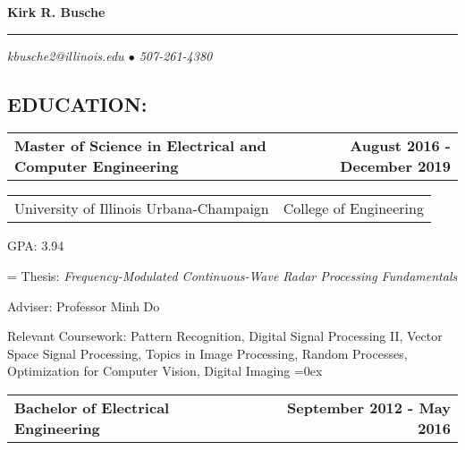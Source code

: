 \documentclass[10pt, letterpaper]{article}
\makeatletter
\newcommand{\headerrow}[2]
{\begin{tabular*}{\linewidth}{l@{\extracolsep{\fill}}r}
	#1 &
	#2 \\
\end{tabular*}}
\newcommand{\sansserif}{\cabin}
\makeatother
\begin{document}
{\sansserif \LARGE \textbf{Kirk R. Busche}}

\rule{\textwidth}{0.5ex}
\vspace{-2em}
\begin{center}
	{\sansserif\small \textit{kbusche2@illinois.edu $\bullet$ 507-261-4380}}
\end{center}

\subsection*{\sansserif EDUCATION:}

\begin{comment}
\headerrow
	{\textbf{Ph.D. Student in Electrical and Computer Engineering}}
	{\textbf{August 2016 - Present}}

University of Illinois Urbana-Champaign

College of Engineering

GPA: 3.94

\newlength{\mylength}
\settowidth{\mylength}{Relevant Coursework:}
\hangindent=\mylength
Relevant Coursework: Pattern Recognition, Digital Signal Processing II, Vector
Space Signal Processing, Topics in Image Processing, Random Processes,
Optimization for Computer Vision, Digital Imaging
\hangindent=0ex
\\
\end{comment}

\headerrow
	{\textbf{Master of Science in Electrical and Computer Engineering}}
	{\textbf{August 2016 - December 2019}}

\headerrow
	{University of Illinois Urbana-Champaign}
	{College of Engineering}

GPA: 3.94

\newlength{\mylength}
\settowidth{\mylength}{Relevant Coursework:}
\hangindent=\mylength
{Thesis: \textit{Frequency-Modulated Continuous-Wave Radar Processing
	Fundamentals}}

{Adviser: Professor Minh Do}

{Relevant Coursework: Pattern Recognition, Digital Signal Processing II, Vector
Space Signal Processing, Topics in Image Processing, Random Processes,
Optimization for Computer Vision, Digital Imaging}
\hangindent=0ex
\\

\headerrow
	{\textbf{Bachelor of Electrical Engineering}}
	{\textbf{September 2012 - May 2016}}
\end{document}
